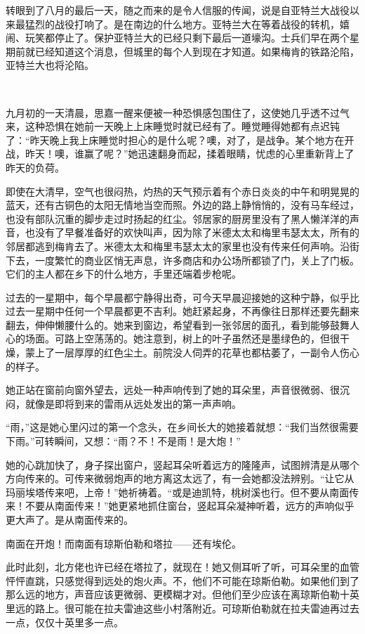 \par 转眼到了八月的最后一天，随之而来的是令人信服的传闻，说是自亚特兰大战役以来最猛烈的战役打响了。是在南边的什么地方。亚特兰大在等着战役的转机，嬉闹、玩笑都停止了。保护亚特兰大的已经只剩下最后一道壕沟。士兵们早在两个星期前就已经知道这个消息，但城里的每个人到现在才知道。如果梅肯的铁路沦陷，亚特兰大也将沦陷。
\par  
\par 九月初的一天清晨，思嘉一醒来便被一种恐惧感包围住了，这使她几乎透不过气来，这种恐惧在她前一天晚上上床睡觉时就已经有了。睡觉睡得她都有点迟钝了：“昨天晚上我上床睡觉时担心的是什么呢？噢，对了，是战争。某个地方在开战，昨天！噢，谁赢了呢？”她迅速翻身而起，揉着眼睛，忧虑的心里重新背上了昨天的负荷。
\par 即使在大清早，空气也很闷热，灼热的天气预示着有个赤日炎炎的中午和明晃晃的蓝天，还有古铜色的太阳无情地当空而照。外边的路上静悄悄的，没有马车经过，也没有部队沉重的脚步走过时扬起的红尘。邻居家的厨房里没有了黑人懒洋洋的声音，也没有了早餐准备好的欢快叫声，因为除了米德太太和梅里韦瑟太太，所有的邻居都逃到梅肯去了。米德太太和梅里韦瑟太太的家里也没有传来任何声响。沿街下去，一度繁忙的商业区悄无声息，许多商店和办公场所都锁了门，关上了门板。它们的主人都在乡下的什么地方，手里还端着步枪呢。
\par 过去的一星期中，每个早晨都宁静得出奇，可今天早晨迎接她的这种宁静，似乎比过去一星期中任何一个早晨都更不吉利。她赶紧起身，不再像往日那样还要先翻来翻去，伸伸懒腰什么的。她来到窗边，希望看到一张邻居的面孔，看到能够鼓舞人心的场面。可路上空荡荡的。她注意到，树上的叶子虽然还是墨绿色的，但很干燥，蒙上了一层厚厚的红色尘土。前院没人伺弄的花草也都枯萎了，一副令人伤心的样子。
\par 她正站在窗前向窗外望去，远处一种声响传到了她的耳朵里，声音很微弱、很沉闷，就像是即将到来的雷雨从远处发出的第一声声响。
\par “雨，”这是她心里闪过的第一个念头，在乡间长大的她接着就想：“我们当然很需要下雨。”可转瞬间，又想：“雨？不！不是雨！是大炮！”
\par 她的心跳加快了，身子探出窗户，竖起耳朵听着远方的隆隆声，试图辨清是从哪个方向传来的。可传来微弱炮声的地方离这太远了，有一会她都没法辨别。“让它从玛丽埃塔传来吧，上帝！”她祈祷着。“或是迪凯特，桃树溪也行。但不要从南面传来！不要从南面传来！”她更紧地抓住窗台，竖起耳朵凝神听着，远方的声响似乎更大声了。是从南面传来的。
\par 南面在开炮！而南面有琼斯伯勒和塔拉——还有埃伦。
\par 此时此刻，北方佬也许已经在塔拉了，就现在！她又侧耳听了听，可耳朵里的血管怦怦直跳，只感觉得到远处的炮火声。不，他们不可能在琼斯伯勒。如果他们到了那么远的地方，声音应该更微弱、更模糊才对。但他们至少应该在离琼斯伯勒十英里远的路上。很可能在拉夫雷迪这些小村落附近。可琼斯伯勒就在拉夫雷迪再过去一点，仅仅十英里多一点。
